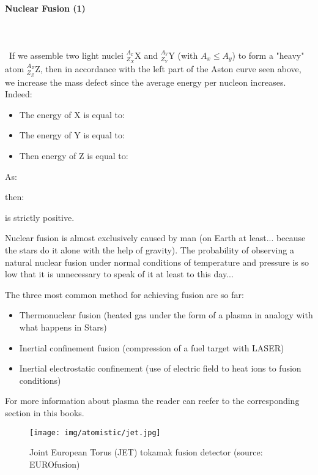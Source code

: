 	\paragraph{Nuclear Fusion (1)}\label{nuclear fusion}\mbox{}\\\\\
	If we assemble two light nuclei $_{Z_X}^{A_x}\mathrm{X}$ and $_{Z_Y}^{A_Y}\mathrm{Y}$ (with $A_x \le A_y$) to form a "heavy" atom $_{Z_Z}^{A_Z}\mathrm{Z}$, then in accordance with the left part of the Aston curve seen above, we increase the mass defect since the average energy per nucleon increases. Indeed:
	\begin{itemize}
		\item The energy of $\mathrm{X}$ is equal to:
		
	
		\item The energy of $\mathrm{Y}$ is equal to:
		
		
		\item Then energy of $\mathrm{Z}$ is equal to:
		
	\end{itemize}
	As:
	
	then:
	
	is strictly positive.
	
	Nuclear fusion is almost exclusively caused by man (on Earth at least... because the stars do it alone with the help of gravity). The probability of observing a natural nuclear fusion under normal conditions of temperature and pressure is so low that it is unnecessary to speak of it at least to this day...
	
	The three most common method for achieving fusion are so far:
	\begin{itemize}
		\item Thermonuclear fusion (heated gas under the form of a plasma in analogy with what happens in Stars)
		\item Inertial confinement fusion (compression of a fuel target with LASER)
		\item Inertial electrostatic confinement (use of electric field to heat ions to fusion conditions)
	\end{itemize}
	For more information about plasma the reader can reefer to the corresponding section in this books.
	\begin{figure}[H]
		\centering
		\texttt{[image: img/atomistic/jet.jpg]}
		\caption[Joint European Torus (JET) tokamak fusion detector]{Joint European Torus (JET) tokamak fusion detector (source: EUROfusion)}
	\end{figure}
	
